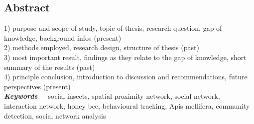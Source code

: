 %
\pagestyle{empty}
\providecommand{\keywords}[1]{\textbf{\textit{Keywords---}} #1}

\subsection*{Abstract}

1) purpose and scope of study, topic of thesis, research question,  gap of knowledge, background infos (present)\\
2) methods employed, research design, structure of thesis (past)\\
3) most important result, findings as they relate to the gap of knowledge, short summary of the results (past)\\
4) principle conclusion, introduction to discussion and recommendations, future perspectives (present)\\


\keywords{social insects, spatial proximity network, social network, interaction network, honey bee, behavioural tracking, Apis mellifera, community detection, social network analysis}

\cleardoublepage
